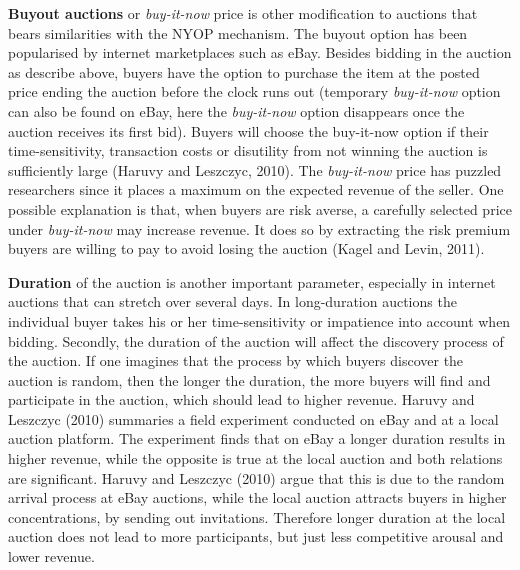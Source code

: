\documentclass[a4paper,12pt]{article}
\makeatletter
\newcommand\fix{%
  \let\set@color\beamerorig@set@color
  \let\reset@color\beamerorig@reset@color}
\makeatother
\begin{document}
	{\bf Buyout auctions} or {\it buy-it-now} price is other modification to auctions that bears similarities with the NYOP mechanism. The buyout option has been popularised by internet marketplaces such as eBay. Besides bidding in the auction as describe above, buyers have the option to purchase the item at the posted price ending the auction before the clock runs out (temporary {\it buy-it-now} option can also be found on eBay, here the {\it buy-it-now} option disappears once the auction receives its first bid). Buyers will choose the buy-it-now option if their time-sensitivity, transaction costs or disutility from not winning the auction is sufficiently large (Haruvy and Leszczyc, 2010). The {\it buy-it-now} price has puzzled researchers since it places a maximum on the expected revenue of the seller. One possible explanation is that, when buyers are risk averse, a carefully selected price under {\it buy-it-now} may increase revenue. It does so by extracting the risk premium buyers are willing to pay to avoid losing the auction (Kagel and Levin, 2011).

	{\bf Duration} of the auction is another important parameter, especially in internet auctions that can stretch over several days. In long-duration auctions the individual buyer takes his or her time-sensitivity or impatience into account when bidding. Secondly, the duration of the auction will affect the discovery process of the auction. If one imagines that the process by which buyers discover the auction is random, then the longer the duration, the more buyers will find and participate in the auction, which should lead to higher revenue. Haruvy and Leszczyc (2010) summaries a field experiment conducted on eBay and at a local auction platform. The experiment finds that on eBay a longer duration results in higher revenue, while the opposite is true at the local auction and both relations are significant. Haruvy and Leszczyc (2010) argue that this is due to the random arrival process at eBay auctions, while the local auction attracts buyers in higher concentrations, by sending out invitations. Therefore longer duration at the local auction does not lead to more participants, but just less competitive arousal and lower revenue. 
\end{document}
